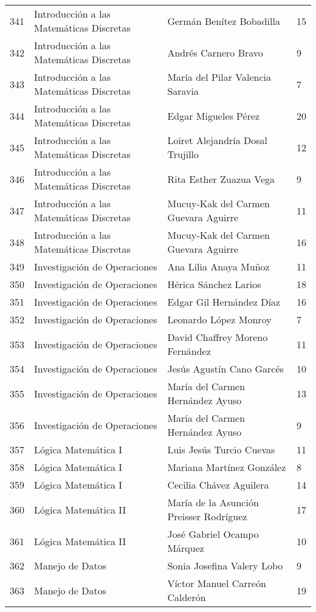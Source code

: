 \begin{table}[ht]
\begin{tabular}{rlll}
  341 & Introducción a las Matemáticas Discretas & Germán Benítez Bobadilla & 15 \\ 
  342 & Introducción a las Matemáticas Discretas & Andrés Carnero Bravo & 9 \\ 
  343 & Introducción a las Matemáticas Discretas & María del Pilar Valencia Saravia & 7 \\ 
  344 & Introducción a las Matemáticas Discretas & Edgar Migueles Pérez & 20 \\ 
  345 & Introducción a las Matemáticas Discretas & Loiret Alejandría Dosal Trujillo & 12 \\ 
  346 & Introducción a las Matemáticas Discretas & Rita Esther Zuazua Vega & 9 \\ 
  347 & Introducción a las Matemáticas Discretas & Mucuy-Kak del Carmen Guevara Aguirre & 11 \\ 
  348 & Introducción a las Matemáticas Discretas & Mucuy-Kak del Carmen Guevara Aguirre & 16 \\ 
  349 & Investigación de Operaciones & Ana Lilia Anaya Muñoz & 11 \\ 
  350 & Investigación de Operaciones & Hérica Sánchez Larios & 18 \\ 
  351 & Investigación de Operaciones & Edgar Gil Hernández Díaz & 16 \\ 
  352 & Investigación de Operaciones & Leonardo López Monroy & 7 \\ 
  353 & Investigación de Operaciones & David Chaffrey Moreno Fernández & 11 \\ 
  354 & Investigación de Operaciones & Jesús Agustín Cano Garcés & 10 \\ 
  355 & Investigación de Operaciones & María del Carmen Hernández Ayuso & 13 \\ 
  356 & Investigación de Operaciones & María del Carmen Hernández Ayuso & 9 \\ 
  357 & Lógica Matemática I & Luis Jesús Turcio Cuevas & 11 \\ 
  358 & Lógica Matemática I & Mariana Martínez González & 8 \\ 
  359 & Lógica Matemática I & Cecilia Chávez Aguilera & 14 \\ 
  360 & Lógica Matemática II & María de la Asunción Preisser Rodríguez & 17 \\ 
  361 & Lógica Matemática II & José Gabriel Ocampo Márquez & 10 \\ 
  362 & Manejo de Datos & Sonia Josefina Valery Lobo & 9 \\ 
  363 & Manejo de Datos & Víctor Manuel Carreón Calderón & 19 \\ 

\end{tabular}
\end{table}
